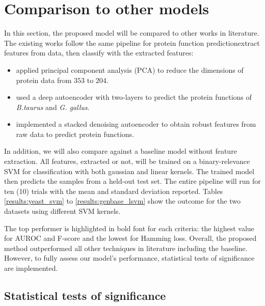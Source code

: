 \section{Comparison to other models}
\label{Benchmarking}

\par In this section, the proposed model will be compared to other works in
literature. The existing works follow the same pipeline for protein function
prediction\textemdash extract features from data, then classify with the
extracted features:

\begin{itemize}
    \item \cite{wang2013protein} applied principal component
    analysis (PCA) to reduce the dimensions of protein data from $353$ to
    $204$. 
    \item \cite{chicco2014deep} used a deep autoencoder with two-layers
    to predict the protein functions of \textit{B.taurus} and \textit{G.
    gallus}. 
    \item \cite{miranda2017feature} implemented a stacked denoising
    autoencoder to obtain robust features from raw data to predict protein
    functions.  
\end{itemize}

\par In addition, we will also compare against a baseline model without feature
extraction. All features, extracted or not, will be trained on a
binary-relevance SVM for classification with both gaussian and linear kernels.
The trained model then predicts the samples from a held-out test set.  The
entire pipeline will run for ten (10) trials with the mean and standard
deviation reported. Tables \ref{results:yeast_svm} to \ref{results:genbase_lsvm}
show the outcome for the two datasets using different SVM kernels.

\par The top performer is highlighted in bold font for each criteria: the
highest value for AUROC and F-score and the lowest for Hamming loss. Overall,
the proposed method outperformed all other techniques in literature including
the baseline. However, to fully assess our model's performance, statistical
tests of significance are implemented.

\subsection{Statistical tests of significance}

